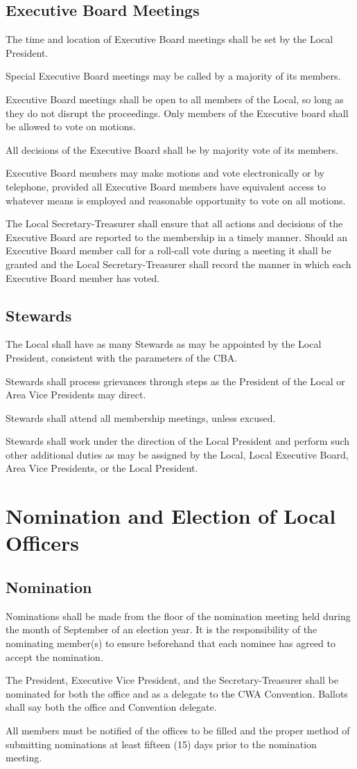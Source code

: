 \documentclass[11pt]{article}
\newcommand{\article}[1]{\vspace{.50cm}\section{#1}}
\newcommand{\articlesection}[1]{\vspace{.25cm}\subsection{#1}}
\begin{document}
\articlesection{Executive Board Meetings}
\begin{paralist}
  \item The time and location of Executive Board meetings shall be set by the Local President.
  \item Special Executive Board meetings may be called by a majority of its members.
  \item Executive Board meetings shall be open to all members of the Local, so long as they do not disrupt the proceedings. Only members of the Executive board shall be allowed to vote on motions.
  \item All decisions of the Executive Board shall be by majority vote of its members.
  \item Executive Board members may make motions and vote electronically or by telephone, provided all Executive Board members have equivalent access to whatever means is employed and reasonable opportunity to vote on all motions.
  \item The Local Secretary-Treasurer shall ensure that all actions and decisions of the Executive Board are reported to the membership in a timely manner. Should an Executive Board member call for a roll-call vote during a meeting it shall be granted and the Local Secretary-Treasurer shall record the manner in which each Executive Board member has voted.
\end{paralist}

\articlesection{Stewards}
\begin{paralist}
  \item The Local shall have as many Stewards as may be appointed by the Local President, consistent with the parameters of the CBA.
  \item Stewards shall process grievances through steps as the President of the Local or Area Vice Presidents may direct.
  \item Stewards shall attend all membership meetings, unless excused.
  \item Stewards shall work under the direction of the Local President and perform such other additional duties as may be assigned by the Local, Local Executive Board, Area Vice Presidents, or the Local President.
\end{paralist}


\article{Nomination and Election of Local Officers}
\articlesection{Nomination}
\begin{paralist}
  \item Nominations shall be made from the floor of the nomination meeting held during the month of September of an election year. It is the responsibility of the nominating member(s) to ensure beforehand that each nominee has agreed to accept the nomination.
  \item The President, Executive Vice President, and the Secretary-Treasurer shall be nominated for both the office and as a delegate to the CWA Convention. Ballots shall say both the office and Convention delegate.
  \item All members must be notified of the offices to be filled and the proper method of submitting nominations at least fifteen (15) days prior to the nomination meeting.
\end{paralist}
\end{document}
